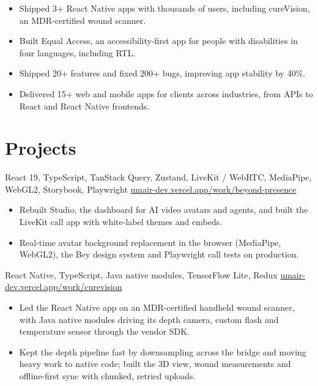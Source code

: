 \begin{itemize}
  \item Shipped 3+ React Native apps with thousands of users, including cureVision, an MDR-certified wound scanner.
  \item Built Equal Access, an accessibility-first app for people with disabilities in four languages, including RTL.
  \item Shipped 20+ features and fixed 200+ bugs, improving app stability by 40\%.
\end{itemize}

\begin{itemize}
  \item Delivered 15+ web and mobile apps for clients across industries, from APIs to React and React Native frontends.
\end{itemize}

\section{Projects}
  {React 19, TypeScript, TanStack Query, Zustand, LiveKit / WebRTC, MediaPipe, WebGL2, Storybook, Playwright}
  {\href{https://umair-dev.vercel.app/work/beyond-presence}{umair-dev.vercel.app/work/beyond-presence}}
\begin{itemize}
  \item Rebuilt Studio, the dashboard for AI video avatars and agents, and built the LiveKit call app with white-label themes and embeds.
  \item Real-time avatar background replacement in the browser (MediaPipe, WebGL2), the Bey design system and Playwright call tests on production.
\end{itemize}

  {React Native, TypeScript, Java native modules, TensorFlow Lite, Redux}
  {\href{https://umair-dev.vercel.app/work/curevision}{umair-dev.vercel.app/work/curevision}}
\begin{itemize}
  \item Led the React Native app on an MDR-certified handheld wound scanner, with Java native modules driving its depth camera, custom flash and temperature sensor through the vendor SDK.
  \item Kept the depth pipeline fast by downsampling across the bridge and moving heavy work to native code; built the 3D view, wound measurements and offline-first sync with chunked, retried uploads.
\end{itemize}

